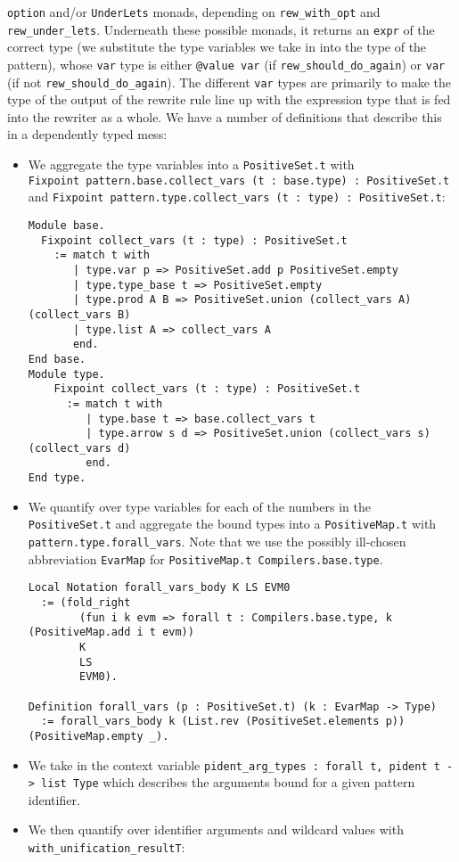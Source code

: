 \begin{itemize}
\begin{itemize}
    \texttt{option} and/or \texttt{UnderLets} monads, depending on
    \texttt{rew\_with\_opt} and \texttt{rew\_under\_lets}. Underneath
    these possible monads, it returns an \texttt{expr} of the correct
    type (we substitute the type variables we take in into the type of
    the pattern), whose \texttt{var} type is either \texttt{@value\ var}
    (if \texttt{rew\_should\_do\_again}) or \texttt{var} (if not
    \texttt{rew\_should\_do\_again}). The different \texttt{var} types
    are primarily to make the type of the output of the rewrite rule
    line up with the expression type that is fed into the rewriter as a
    whole. We have a number of definitions that describe this in a
    dependently typed mess:

    \begin{itemize}
    \item
      We aggregate the type variables into a \texttt{PositiveSet.t} with
      \texttt{Fixpoint\ pattern.base.collect\_vars\ (t\ :\ base.type)\ :\ PositiveSet.t}
      and
      \texttt{Fixpoint\ pattern.type.collect\_vars\ (t\ :\ type)\ :\ PositiveSet.t}:

\begin{verbatim}
Module base.
  Fixpoint collect_vars (t : type) : PositiveSet.t
    := match t with
       | type.var p => PositiveSet.add p PositiveSet.empty
       | type.type_base t => PositiveSet.empty
       | type.prod A B => PositiveSet.union (collect_vars A) (collect_vars B)
       | type.list A => collect_vars A
       end.
End base.
Module type.
    Fixpoint collect_vars (t : type) : PositiveSet.t
      := match t with
         | type.base t => base.collect_vars t
         | type.arrow s d => PositiveSet.union (collect_vars s) (collect_vars d)
         end.
End type.
\end{verbatim}
    \item
      We quantify over type variables for each of the numbers in the
      \texttt{PositiveSet.t} and aggregate the bound types into a
      \texttt{PositiveMap.t} with \texttt{pattern.type.forall\_vars}.
      Note that we use the possibly ill-chosen abbreviation
      \texttt{EvarMap} for \texttt{PositiveMap.t\ Compilers.base.type}.

\begin{verbatim}
Local Notation forall_vars_body K LS EVM0
  := (fold_right
        (fun i k evm => forall t : Compilers.base.type, k (PositiveMap.add i t evm))
        K
        LS
        EVM0).

Definition forall_vars (p : PositiveSet.t) (k : EvarMap -> Type)
  := forall_vars_body k (List.rev (PositiveSet.elements p)) (PositiveMap.empty _).
\end{verbatim}
    \item
      We take in the context variable
      \texttt{pident\_arg\_types\ :\ forall\ t,\ pident\ t\ -\textgreater{}\ list\ Type}
      which describes the arguments bound for a given pattern
      identifier.
    \item
      We then quantify over identifier arguments and wildcard values
      with \texttt{with\_unification\_resultT}:


\end{itemize}
\end{itemize}
\end{itemize}
